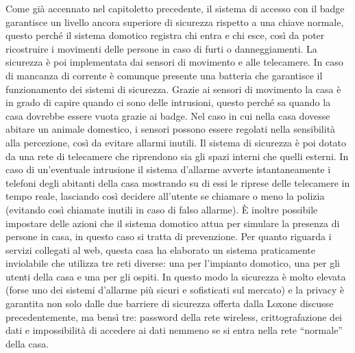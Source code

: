 Come già accennato nel capitoletto precedente, il sistema di accesso con il badge garantisce un livello ancora superiore di sicurezza rispetto a una chiave normale, questo perché il sistema domotico registra chi entra e chi esce, così da poter ricostruire i movimenti delle persone in caso di furti o danneggiamenti. La sicurezza è poi implementata dai sensori di movimento e alle telecamere. In caso di mancanza di corrente è comunque presente una batteria che garantisce il funzionamento dei sistemi di sicurezza. Grazie ai sensori di movimento la casa è in grado di capire quando ci sono delle intrusioni, questo perché sa quando la casa dovrebbe essere vuota grazie ai badge. Nel caso in cui nella casa dovesse abitare un animale domestico, i sensori possono essere regolati nella sensibilità alla percezione, così da evitare allarmi inutili. Il sistema di sicurezza è poi dotato da una rete di telecamere che riprendono sia gli spazi interni che quelli esterni. In caso di un’eventuale intrusione il sistema d’allarme avverte istantaneamente i telefoni degli abitanti della casa mostrando su di essi le riprese delle telecamere in tempo reale, lasciando così decidere all’utente se chiamare o meno la polizia (evitando così chiamate inutili in caso di falso allarme). È inoltre possibile impostare delle azioni che il sistema domotico attua per simulare la presenza di persone in casa, in questo caso si tratta di prevenzione. 
Per quanto riguarda i servizi collegati al web, questa casa ha elaborato un sistema praticamente inviolabile che utilizza tre reti diverse: una per l’impianto domotico, una per gli utenti della casa e una per gli ospiti. In questo modo la sicurezza è molto elevata (forse uno dei sistemi d’allarme più sicuri e sofisticati sul mercato) e la privacy è garantita non solo dalle due barriere di sicurezza offerta dalla Loxone discusse precedentemente, ma bensì tre: password della rete wireless, crittografazione dei dati e impossibilità di accedere ai dati nemmeno se si entra nella rete “normale” della casa. 
